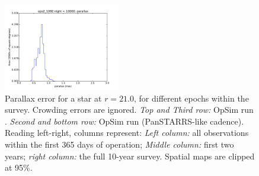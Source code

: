\begin{figure}[ht]
\begin{center}
  \includegraphics[width=2.0in]{./figs/milkyway/MW_Astrom_paError_1092_10y_hst.pdf}
  \end{center}
  \caption{Parallax error for a star at $r=21.0$, for different epochs within the survey. Crowding errors are ignored. {\it Top and Third row:} OpSim run . {\it Second and bottom row:} OpSim run  (PanSTARRS-like cadence). Reading left-right, columns represent: {\it Left column:} all observations within the first 365 days of operation; {\it Middle column:} first two years; {\it right column:} the full 10-year survey. Spatial maps are clipped at 95\%.}
  \label{fig_astrom_ByTime_paError}
\end{figure}

